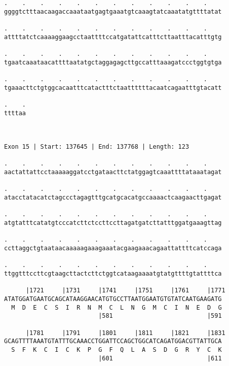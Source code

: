 \documentclass{article}
\begin{document}
\begin{Verbatim}
.    .    .    .    .    .    .    .    .    .    .    .    
ggggtctttaacaagaccaaataatgagtgaaatgtcaaagtatcaaatatgttttatat
                                                            
.    .    .    .    .    .    .    .    .    .    .    .    
attttatctcaaaaggaagcctaattttccatgatattcatttcttaatttacatttgtg
                                                            
.    .    .    .    .    .    .    .    .    .    .    .    
tgaatcaaataacattttaatatgctaggagagcttgccatttaaagatccctggtgtga
                                                            
.    .    .    .    .    .    .    .    .    .    .    .    
tgaaacttctgtggcacaatttcatactttctaattttttacaatcagaatttgtacatt
                                                            
.    .
ttttaa
      
      
 
Exon 15 | Start: 137645 | End: 137768 | Length: 123
 
.    .    .    .    .    .    .    .    .    .    .    .    
aactattattcctaaaaaggatcctgataacttctatggagtcaaattttataaatagat
                                                            
.    .    .    .    .    .    .    .    .    .    .    .    
atacctatacatctagccctagagtttgcatgcacatgccaaaactcaagaacttgagat
                                                            
.    .    .    .    .    .    .    .    .    .    .    .    
atgtatttcatatgtcccatcttctccttccttagatgatcttatttggatgaaagttag
                                                            
.    .    .    .    .    .    .    .    .    .    .    .    
ccttaggctgtaataacaaaaagaaagaaatacgaagaaacagaattattttcatccaga
                                                            
.    .    .    .    .    .    .    .    .    .    .    .    
ttggtttccttcgtaagcttactcttctggtcataagaaaatgtatgttttgtattttca
                                                            
      |1721     |1731     |1741     |1751     |1761     |1771
ATATGGATGAATGCAGCATAAGGAACATGTGCCTTAATGGAATGTGTATCAATGAAGATG
  M  D  E  C  S  I  R  N  M  C  L  N  G  M  C  I  N  E  D  G
                          |581                          |591
  
      |1781     |1791     |1801     |1811     |1821     |1831
GCAGTTTTAAATGTATTTGCAAACCTGGATTCCAGCTGGCATCAGATGGACGTTATTGCA
  S  F  K  C  I  C  K  P  G  F  Q  L  A  S  D  G  R  Y  C  K
                          |601                          |611
  

\end{Verbatim}
\end{document}
